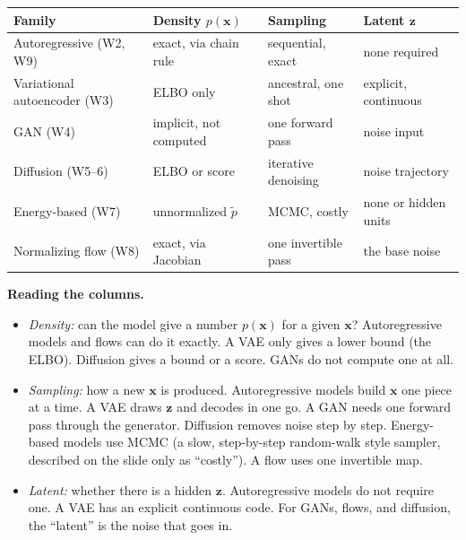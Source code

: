 \begin{center}
\begin{tabular}{p{}p{}p{}p{}}
\toprule
Family & Density $p(\mathbf{x})$ & Sampling & Latent $\mathbf{z}$ \\
\midrule
Autoregressive (W2, W9) & exact, via chain rule & sequential, exact & none required \\ \addlinespace
Variational autoencoder (W3) & ELBO only & ancestral, one shot & explicit, continuous \\ \addlinespace
GAN (W4) & implicit, not computed & one forward pass & noise input \\ \addlinespace
Diffusion (W5--6) & ELBO or score & iterative denoising & noise trajectory \\ \addlinespace
Energy-based (W7) & unnormalized $\tilde p$ & MCMC, costly & none or hidden units \\ \addlinespace
Normalizing flow (W8) & exact, via Jacobian & one invertible pass & the base noise \\
\bottomrule
\end{tabular}
\end{center}

\textbf{Reading the columns.}
\begin{itemize}
\item \textit{Density:} can the model give a number $p(\mathbf{x})$ for a given $\mathbf{x}$? Autoregressive models and flows can do it exactly. A VAE only gives a lower bound (the ELBO). Diffusion gives a bound or a score. GANs do not compute one at all.
\item \textit{Sampling:} how a new $\mathbf{x}$ is produced. Autoregressive models build $\mathbf{x}$ one piece at a time. A VAE draws $\mathbf{z}$ and decodes in one go. A GAN needs one forward pass through the generator. Diffusion removes noise step by step. Energy-based models use MCMC (a slow, step-by-step random-walk style sampler, described on the slide only as ``costly''). A flow uses one invertible map.
\item \textit{Latent:} whether there is a hidden $\mathbf{z}$. Autoregressive models do not require one. A VAE has an explicit continuous code. For GANs, flows, and diffusion, the ``latent'' is the noise that goes in.
\end{itemize}

